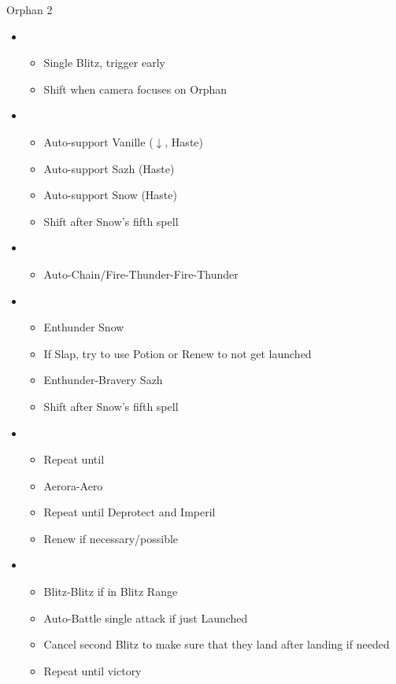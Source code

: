 \begin{battle}[1:05]{Orphan 2}
	\begin{multicols}{2}
		\begin{itemize}
			\item \second
			      \begin{itemize}
				      \item Single Blitz, trigger early
				      \item Shift when camera focuses on Orphan
			      \end{itemize}
			\item \fourth
			      \begin{itemize}
				      \item Auto-support Vanille ($\downarrow$, Haste)
				      \item Auto-support Sazh (Haste)
				      \item Auto-support Snow (Haste)
				      \item Shift after Snow's fifth spell
			      \end{itemize}
			\item \sixth
			      \begin{itemize}
				      \item Auto-Chain/Fire-Thunder-Fire-Thunder
			      \end{itemize}
			\item \fourth
			      \begin{itemize}
				      \item Enthunder Snow
				      \item If Slap, try to use Potion or Renew to not get launched
				      \item Enthunder-Bravery Sazh
				      \item Shift after Snow's fifth spell
			      \end{itemize}
			      \columnbreak
			\item \fifth
			      \begin{itemize}
				      \item Repeat until \stagger
				      \item Aerora-Aero
				      \item Repeat until Deprotect and Imperil
				      \item Renew if necessary/possible
			      \end{itemize}
			\item \first
			      \begin{itemize}
				      \item Blitz-Blitz if in Blitz Range
				      \item Auto-Battle single attack if just Launched
				      \item Cancel second Blitz to make sure that they land after landing if needed
				      \item Repeat until victory
			      \end{itemize}
		\end{itemize}
	\end{multicols}
\end{battle}
